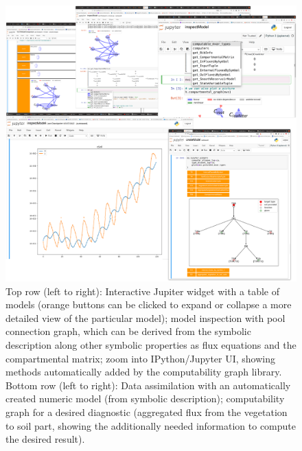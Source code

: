 \begin{figure}[h]
\includegraphics[width=\columnwidth]{TabScreenCombined.pdf}
  \caption{
      Top row (left to right): Interactive Jupiter widget
      with a table of models (orange buttons can be clicked to expand or
      collapse a more detailed view of the particular model); model inspection
      with pool connection graph, which can be derived from the symbolic
      description along other symbolic properties as flux equations and the
      compartmental matrix; zoom into IPython/Jupyter UI, showing methods
      automatically added by the computability graph library.  \\ Bottom row (left to right):
      Data assimilation with an automatically created numeric model (from
      symbolic description); computability graph for a desired diagnostic
      (aggregated flux from the vegetation to soil part, showing the
      additionally needed information to compute the desired result).
  }
  \label{fig:overview}
\end{figure}

